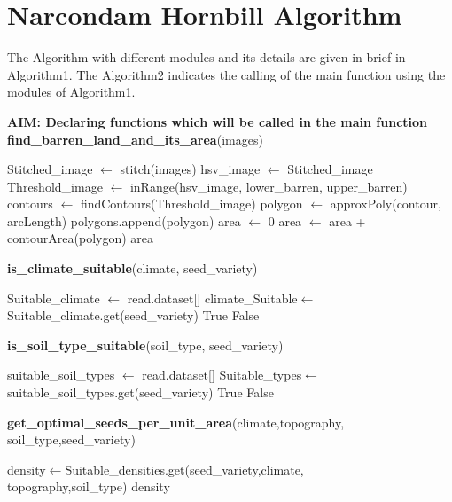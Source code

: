 \documentclass[conference]{IEEEtran}
\begin{document}
\section{Narcondam Hornbill Algorithm}
The Algorithm with different modules and its details are given in brief in Algorithm1.
\newline The Algorithm2 indicates the calling of the main function using the modules of Algorithm1.
\begin{algorithm} [ht]
\begin{scriptsize}
\begin{algorithmic}[1]
\label{algo1}
\STATE \textbf{AIM: Declaring functions which will be called in the main function}
\STATE \textbf{find\_barren\_land\_and\_its\_area}(images) 
    \begin{ALC@g}
    \STATE  Stitched\_image $\gets$ stitch(images)
    \STATE  hsv\_image $\gets$ Stitched\_image
    \STATE  Threshold\_image $\gets$ inRange(hsv\_image, lower\_barren, upper\_barren)
    \STATE  contours $\gets$ findContours(Threshold\_image)
        \STATE  polygon $\gets$ approxPoly(contour, arcLength)
        \STATE  polygons.append(polygon)
    \ENDFOR
    \STATE  area $\gets$ 0
    \STATE  area $\gets$ area + contourArea(polygon)
    \ENDFOR
    \RETURN  area
    \end{ALC@g}
\smallbreak
\STATE \textbf{is\_climate\_suitable}(climate, seed\_variety)
    \begin{ALC@g}
    \STATE Suitable\_climate $\gets$ read.dataset[]
    \STATE climate\_Suitable$\gets$Suitable\_climate.get(seed\_variety)
        \RETURN  True
    \ELSE
        \RETURN  False
    \ENDIF
    \end{ALC@g}
\smallbreak
\STATE \textbf{is\_soil\_type\_suitable}(soil\_type, seed\_variety)
    \begin{ALC@g}
    \STATE suitable\_soil\_types $\gets$ read.dataset[]
    \STATE Suitable\_types$\gets$suitable\_soil\_types.get(seed\_variety)
        \RETURN  True
    \ELSE
       \RETURN  False
    \ENDIF
    \end{ALC@g}
\smallbreak

\STATE \textbf{get\_optimal\_seeds\_per\_unit\_area}(climate,topography,\\soil\_type,seed\_variety) 
    \begin{ALC@g}
    \STATE  density$\gets$Suitable\_densities.get(seed\_variety,climate,\\topography,soil\_type)
    \RETURN  density
    \end{ALC@g}
\smallbreak


\end{algorithmic}
\end{scriptsize}
\end{algorithm}
\end{document}
